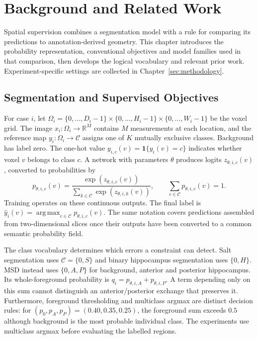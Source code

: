 \documentclass[12pt,a4paper]{article}
\begin{document}
\clearpage
\section{Background and Related Work}\label{sec:background}

Spatial supervision combines a segmentation model with a rule for comparing
its predictions to annotation-derived geometry. This chapter introduces
the probability representation, conventional objectives and model families
used in that comparison, then develops the logical vocabulary and relevant
prior work. Experiment-specific settings are collected in
Chapter~\ref{sec:methodology}.

\subsection{Segmentation and Supervised Objectives}
\label{sec:volumetric-segmentation}\label{sec:segmentation-objectives}

For case $i$, let
$\Omega_i=\{0,\ldots,D_i-1\}\times\{0,\ldots,H_i-1\}\times
\{0,\ldots,W_i-1\}$ be the voxel grid. The image
$x_i:\Omega_i\to\mathbb R^M$ contains $M$ measurements at each location,
and the reference map $y_i:\Omega_i\to\mathcal C$ assigns one of $K$
mutually exclusive classes. Background has label zero. The one-hot value
$y_{i,c}(v)=\mathbf1\{y_i(v)=c\}$ indicates whether voxel $v$ belongs to
class $c$. A network with parameters $\theta$ produces logits
$z_{\theta,i,c}(v)$, converted to probabilities by
\begin{equation}
p_{\theta,i,c}(v)=
\frac{\exp(z_{\theta,i,c}(v))}
{\sum_{k\in\mathcal{C}}\exp(z_{\theta,i,k}(v))},
\qquad
\sum_{c\in\mathcal{C}}p_{\theta,i,c}(v)=1.
\label{eq:segmentation-softmax}
\end{equation}
Training operates on these continuous outputs. The final label is
$\widehat y_i(v)=\operatorname{arg\,max}_{c\in\mathcal C}
p_{\theta,i,c}(v)$. The same notation covers predictions assembled from
two-dimensional slices once their outputs have been converted to a common
semantic probability field.

The class vocabulary determines which errors a constraint can detect.
Salt segmentation uses $\mathcal C=\{0,S\}$ and binary hippocampus
segmentation uses $\{0,H\}$. MSD instead uses $\{0,A,P\}$ for background,
anterior and posterior hippocampus. Its whole-foreground probability is
$q_i=p_{\theta,i,A}+p_{\theta,i,P}$. A term depending only on this sum
cannot distinguish an anterior/posterior exchange that preserves it.
Furthermore, foreground thresholding and multiclass argmax are distinct
decision rules: for $(p_0,p_A,p_P)=(0.40,0.35,0.25)$, the foreground sum
exceeds $0.5$ although background is the most probable individual class.
The experiments use multiclass argmax before evaluating the labelled
regions.
\end{document}
